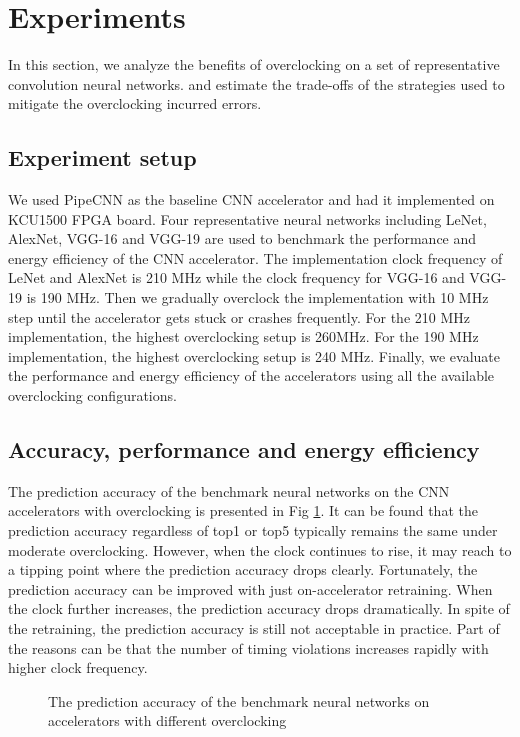 \section{Experiments}
In this section, we analyze the benefits of 
overclocking on a set of representative convolution neural networks.
and estimate the trade-offs of the strategies 
used to mitigate the overclocking incurred errors.

\subsection{Experiment setup}
We used PipeCNN as the baseline CNN accelerator and had it implemented on KCU1500 FPGA board.
Four representative neural networks including LeNet, AlexNet, VGG-16 and VGG-19 are used to 
benchmark the performance and energy efficiency of the CNN accelerator. The implementation clock
frequency of LeNet and AlexNet is 210 MHz while the clock frequency for VGG-16 and VGG-19 is 
190 MHz. Then we gradually overclock the implementation with 10 MHz step until the accelerator gets 
stuck or crashes frequently. For the 210 MHz implementation, the highest overclocking setup is 
260MHz. For the 190 MHz implementation, the highest overclocking setup is 240 MHz.
Finally, we evaluate the performance and energy efficiency of the accelerators using 
all the available overclocking configurations.

\subsection{Accuracy, performance and energy efficiency}
The prediction accuracy of the benchmark neural networks on the CNN accelerators with overclocking is 
presented in Fig \ref{fig:overclock-accuracy}. It can be found that the prediction accuracy 
regardless of top1 or top5 typically remains the same under moderate overclocking. However, when the clock 
continues to rise, it may reach to a tipping point where the prediction accuracy drops clearly. 
Fortunately, the prediction accuracy can be improved with just on-accelerator retraining.
When the clock further increases, the prediction accuracy drops dramatically. In spite of the retraining, 
the prediction accuracy is still not acceptable in practice. Part of the reasons can be that the 
number of timing violations increases rapidly with higher clock frequency. 
\begin{figure}
        \center
	\qquad
	\qquad
        \qquad
	\caption{The prediction accuracy of the benchmark neural networks on accelerators with different overclocking}
        \label{fig:overclock-accuracy}
		\vspace{-1em}
\end{figure}


